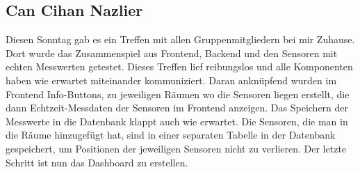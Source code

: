 \documentclass[]{article}
\begin{document}
\subsection{Can Cihan Nazlier}
Diesen Sonntag gab es ein Treffen mit allen Gruppenmitgliedern bei mir Zuhause. Dort wurde das Zusammenspiel aus Frontend, Backend und den Sensoren mit echten Messwerten getestet. Dieses Treffen lief reibungslos und alle Komponenten haben wie erwartet miteinander kommuniziert. Daran anknüpfend wurden im Frontend Info-Buttons, zu jeweiligen Räumen wo die Sensoren liegen erstellt, die dann Echtzeit-Messdaten der Sensoren im Frontend anzeigen. Das Speichern der Messwerte in die Datenbank klappt auch wie erwartet.
Die Sensoren, die man in die Räume hinzugefügt hat, sind in einer separaten Tabelle in der Datenbank gespeichert, um Positionen der jeweiligen Sensoren nicht zu verlieren.
Der letzte Schritt ist nun das Dashboard zu erstellen.

\printbibliography
\end{document}

